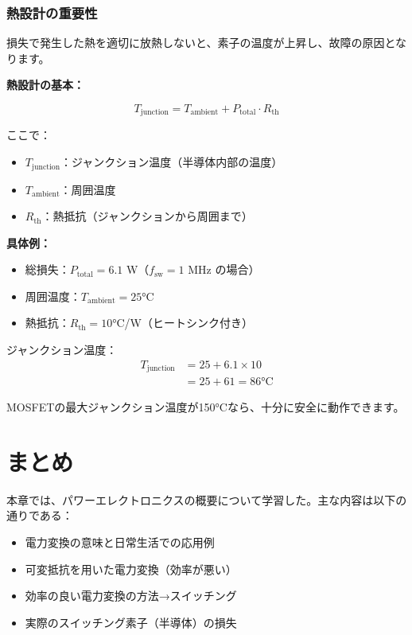 \subsubsection{熱設計の重要性}

損失で発生した熱を適切に放熱しないと、素子の温度が上昇し、故障の原因となります。

\begin{screen}
\textbf{熱設計の基本：}

\begin{equation}
T_{\text{junction}} = T_{\text{ambient}} + P_{\text{total}} \cdot R_{\text{th}}
\end{equation}

ここで：
\begin{itemize}
\item $T_{\text{junction}}$：ジャンクション温度（半導体内部の温度）
\item $T_{\text{ambient}}$：周囲温度
\item $R_{\text{th}}$：熱抵抗（ジャンクションから周囲まで）
\end{itemize}

\textbf{具体例：}

\begin{itemize}
\item 総損失：$P_{\text{total}} = 6.1$ W（$f_{\text{sw}}=1$ MHz の場合）
\item 周囲温度：$T_{\text{ambient}} = 25$°C
\item 熱抵抗：$R_{\text{th}} = 10$°C/W（ヒートシンク付き）
\end{itemize}

ジャンクション温度：
\begin{align}
T_{\text{junction}} &= 25 + 6.1 \times 10 \\
&= 25 + 61 = 86 \text{°C}
\end{align}

MOSFETの最大ジャンクション温度が150°Cなら、十分に安全に動作できます。
\end{screen}

\section{まとめ}

本章では、パワーエレクトロニクスの概要について学習した。主な内容は以下の通りである：

\begin{itemize}
\item 電力変換の意味と日常生活での応用例
\item 可変抵抗を用いた電力変換（効率が悪い）
\item 効率の良い電力変換の方法→スイッチング
\item 実際のスイッチング素子（半導体）の損失
\end{itemize}

